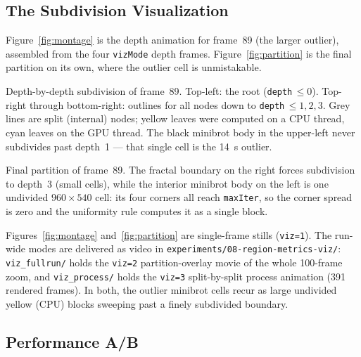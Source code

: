 \documentclass[
	english,
	letterpaper, oneside
]{article}
\begin{document}
\subsection{The Subdivision Visualization}

Figure~\ref{fig:montage} is the depth animation for frame~89 (the larger
outlier), assembled from the four \texttt{vizMode} depth frames.
Figure~\ref{fig:partition} is the final partition on its own, where the outlier
cell is unmistakable.

            {Depth-by-depth subdivision of frame~89. Top-left: the root
             (\texttt{depth}\,$\le 0$). Top-right through bottom-right: outlines
             for all nodes down to \texttt{depth}\,$\le 1,2,3$. Grey lines are
             split (internal) nodes; yellow leaves were computed on a CPU
             thread, cyan leaves on the GPU thread. The black minibrot body in
             the upper-left never subdivides past depth~1 --- that single
             cell is the 14~s outlier. \label{fig:montage}}

            {Final partition of frame~89. The fractal boundary on the right
             forces subdivision to depth~3 (small cells), while the interior
             minibrot body on the left is one undivided $960\times540$ cell: its
             four corners all reach \texttt{maxIter}, so the corner spread is
             zero and the uniformity rule computes it as a single block.
             \label{fig:partition}}

Figures~\ref{fig:montage} and~\ref{fig:partition} are single-frame stills
(\texttt{viz=1}). The run-wide modes are delivered as video in
\texttt{experiments/08-region-metrics-viz/}: \texttt{viz\_fullrun/} holds the
\texttt{viz=2} partition-overlay movie of the whole 100-frame zoom, and
\texttt{viz\_process/} holds the \texttt{viz=3} split-by-split process animation
(391 rendered frames). In both, the outlier minibrot cells recur as large
undivided yellow (CPU) blocks sweeping past a finely subdivided boundary.

\subsection{Performance A/B}
\end{document}
